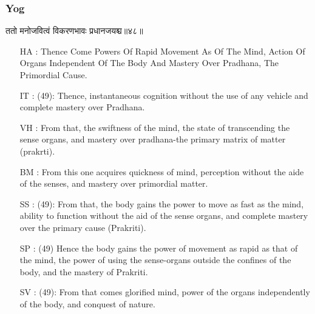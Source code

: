 \begin{frame}[fragile]\frametitle{Yog}
\begin{sanskrit}
ततो मनोजवित्वं विकरणभावः प्रधानजयश्च॥४८॥
\end{sanskrit}

	\begin{itemize}
	\item [HA]: Thence Come Powers Of Rapid Movement As Of The Mind, Action Of Organs Independent Of The Body And Mastery Over Pradhana, The Primordial Cause.
	\item [IT]: (49): Thence, instantaneous cognition without the use of any vehicle and complete mastery over Pradhana.
	\item [VH]: From that, the swiftness of the mind, the state of transcending the sense organs, and mastery over pradhana-the primary matrix of matter (prakrti).
	\item [BM]: From this one acquires quickness of mind, perception without the aide of the senses, and mastery over primordial matter.
	\item [SS]: (49): From that, the body gains the power to move as fast as the mind, ability to function without the aid of the sense organs, and complete mastery over the primary cause (Prakriti).
	\item [SP]: (49) Hence the body gains the power of movement as rapid as that of the mind, the power of using the sense-organs outside the confines of the body, and the mastery of Prakriti.
	\item [SV]: (49): From that comes glorified mind, power of the organs independently of the body, and conquest of nature. 
	\end{itemize}
\end{frame}



